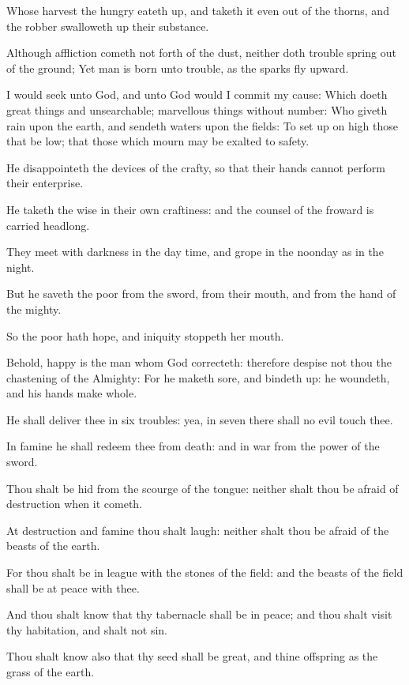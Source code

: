 \verse Whose harvest the hungry eateth up, and taketh it even out of the thorns, and the robber swalloweth up their substance.

\verse Although affliction cometh not forth of the dust, neither doth trouble spring out of the ground; \verse Yet man is born unto trouble, as the sparks fly upward.

\verse I would seek unto God, and unto God would I commit my cause: \verse Which doeth great things and unsearchable; marvellous things without number: \verse Who giveth rain upon the earth, and sendeth waters upon the fields: \verse To set up on high those that be low; that those which mourn may be exalted to safety.

\verse He disappointeth the devices of the crafty, so that their hands cannot perform their enterprise.

\verse He taketh the wise in their own craftiness: and the counsel of the froward is carried headlong.

\verse They meet with darkness in the day time, and grope in the noonday as in the night.

\verse But he saveth the poor from the sword, from their mouth, and from the hand of the mighty.

\verse So the poor hath hope, and iniquity stoppeth her mouth.

\verse Behold, happy is the man whom God correcteth: therefore despise not thou the chastening of the Almighty: \verse For he maketh sore, and bindeth up: he woundeth, and his hands make whole.

\verse He shall deliver thee in six troubles: yea, in seven there shall no evil touch thee.

\verse In famine he shall redeem thee from death: and in war from the power of the sword.

\verse Thou shalt be hid from the scourge of the tongue: neither shalt thou be afraid of destruction when it cometh.

\verse At destruction and famine thou shalt laugh: neither shalt thou be afraid of the beasts of the earth.

\verse For thou shalt be in league with the stones of the field: and the beasts of the field shall be at peace with thee.

\verse And thou shalt know that thy tabernacle shall be in peace; and thou shalt visit thy habitation, and shalt not sin.

\verse Thou shalt know also that thy seed shall be great, and thine offspring as the grass of the earth.

